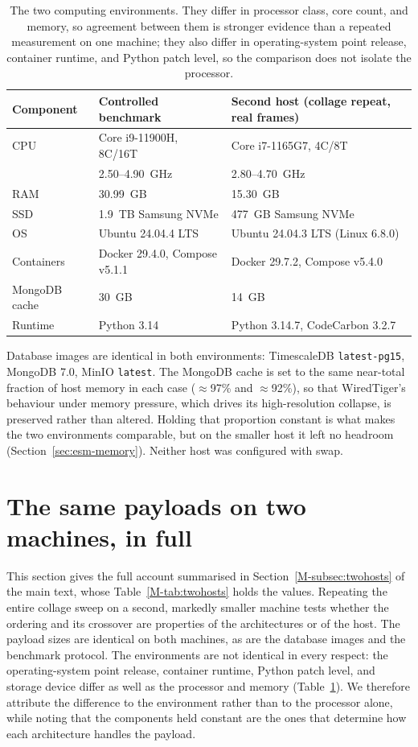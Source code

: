 \documentclass[11pt]{article}
\begin{document}
\begin{table}[htbp]
\centering
\caption{The two computing environments. They differ in processor class, core count, and memory, so agreement between them is stronger evidence than a repeated measurement on one machine; they also differ in operating-system point release, container runtime, and Python patch level, so the comparison does not isolate the processor.}\label{tab:esm-env2}
\small
\begin{tabular}{@{}lll@{}}
\toprule
Component & Controlled benchmark & Second host (collage repeat, real frames) \\
\midrule
CPU & Core i9-11900H, 8C/16T & Core i7-1165G7, 4C/8T \\
    & 2.50--4.90~GHz & 2.80--4.70~GHz \\
RAM & 30.99~GB & 15.30~GB \\
SSD & 1.9~TB Samsung NVMe & 477~GB Samsung NVMe \\
OS & Ubuntu 24.04.4 LTS & Ubuntu 24.04.3 LTS (Linux 6.8.0) \\
Containers & Docker 29.4.0, Compose v5.1.1 & Docker 29.7.2, Compose v5.4.0 \\
MongoDB cache & 30~GB & 14~GB \\
Runtime & Python 3.14 & Python 3.14.7, CodeCarbon 3.2.7 \\
\bottomrule
\end{tabular}

\smallskip
\parbox{0.9\linewidth}{\footnotesize Database images are identical in both environments: TimescaleDB \texttt{latest-pg15}, MongoDB 7.0, MinIO \texttt{latest}. The MongoDB cache is set to the same near-total fraction of host memory in each case ($\approx$97\% and $\approx$92\%), so that WiredTiger's behaviour under memory pressure, which drives its high-resolution collapse, is preserved rather than altered. Holding that proportion constant is what makes the two environments comparable, but on the smaller host it left no headroom (Section~\ref{sec:esm-memory}). Neither host was configured with swap.}
\end{table}

\section{The same payloads on two machines, in full}\label{sec:esm-twohosts}
This section gives the full account summarised in Section~\ref{M-subsec:twohosts} of the main text, whose Table~\ref{M-tab:twohosts} holds the values. Repeating the entire collage sweep on a second, markedly smaller machine tests whether the ordering and its crossover are properties of the architectures or of the host. The payload sizes are identical on both machines, as are the database images and the benchmark protocol. The environments are not identical in every respect: the operating-system point release, container runtime, Python patch level, and storage device differ as well as the processor and memory (Table~\ref{tab:esm-env2}). We therefore attribute the difference to the environment rather than to the processor alone, while noting that the components held constant are the ones that determine how each architecture handles the payload.
\end{document}
